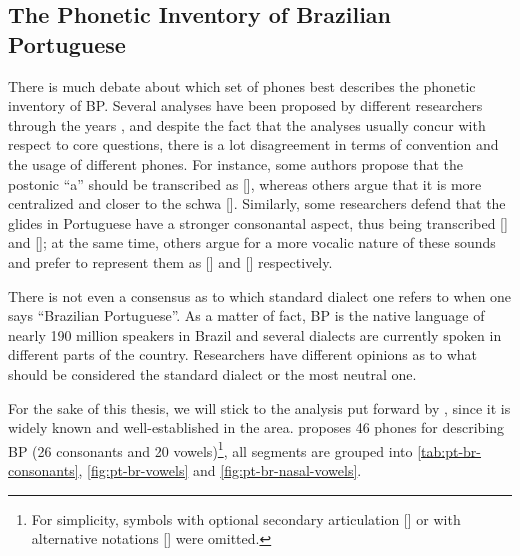 \subsection{The Phonetic Inventory of Brazilian Portuguese} 

There is much debate about which set of phones best describes the phonetic inventory of \gls{BP}. Several analyses have been proposed by different researchers through the years \cite{Bisol2005, Cagliari2002, Camara1970, Cristofaro2005, Neves1999}, and despite the fact that the analyses usually concur with respect to core questions, there is a lot disagreement in terms of convention and the usage of different phones.  For instance, some authors propose that the postonic ``a'' should be transcribed as [], whereas others argue that it is more centralized and closer to the schwa []. Similarly, some researchers defend that the glides in Portuguese have a stronger consonantal aspect, thus being transcribed [] and []; at the same time, others argue for a more vocalic nature of these sounds and prefer to represent them as [] and [] respectively. 

There is not even a consensus as to which standard dialect one refers to when one says ``Brazilian Portuguese''. As a matter of fact, \gls{BP} is the native language of nearly 190 million speakers in Brazil \cite{Ethnologue2005} and several dialects are currently spoken in different parts of the country. Researchers have different opinions as to what should be considered the standard dialect or the most neutral one.

For the sake of this thesis, we will stick to the analysis put forward by \citet{Cristofaro2005}, since it is widely known and well-established in the area. \citet{Cristofaro2005} proposes 46 phones for describing \gls{BP} (26 consonants and 20 vowels)\footnote{For simplicity, symbols with optional secondary articulation [] or with alternative notations [] were omitted.}, all segments are grouped into \autoref{tab:pt-br-consonants}, \autoref{fig:pt-br-vowels} and \autoref{fig:pt-br-nasal-vowels}.

